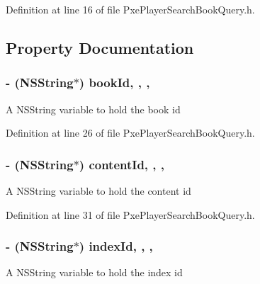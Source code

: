 Definition at line 16 of file Pxe\-Player\-Search\-Book\-Query.\-h.



\subsection{Property Documentation}
\hypertarget{interface_pxe_player_search_book_query_af431710f9f3abeb1dd40a615125f8844}{
\subsubsection[{book\-Id}]{\setlength{\rightskip}{0pt plus 5cm}-\/ (N\-S\-String$\ast$) book\-Id\hspace{0.3cm}{\ttfamily [read]}, {\ttfamily [write]}, {\ttfamily [nonatomic]}, {\ttfamily [strong]}}}\label{interface_pxe_player_search_book_query_af431710f9f3abeb1dd40a615125f8844}
A N\-S\-String variable to hold the book id 

Definition at line 26 of file Pxe\-Player\-Search\-Book\-Query.\-h.

\hypertarget{interface_pxe_player_search_book_query_a060e888d46e8aeb261068cabc92f16bd}{
\subsubsection[{content\-Id}]{\setlength{\rightskip}{0pt plus 5cm}-\/ (N\-S\-String$\ast$) content\-Id\hspace{0.3cm}{\ttfamily [read]}, {\ttfamily [write]}, {\ttfamily [nonatomic]}, {\ttfamily [strong]}}}\label{interface_pxe_player_search_book_query_a060e888d46e8aeb261068cabc92f16bd}
A N\-S\-String variable to hold the content id 

Definition at line 31 of file Pxe\-Player\-Search\-Book\-Query.\-h.

\hypertarget{interface_pxe_player_search_book_query_adb97282496feeeb0ee92b973513bab35}{
\subsubsection[{index\-Id}]{\setlength{\rightskip}{0pt plus 5cm}-\/ (N\-S\-String$\ast$) index\-Id\hspace{0.3cm}{\ttfamily [read]}, {\ttfamily [write]}, {\ttfamily [nonatomic]}, {\ttfamily [strong]}}}\label{interface_pxe_player_search_book_query_adb97282496feeeb0ee92b973513bab35}
A N\-S\-String variable to hold the index id 

